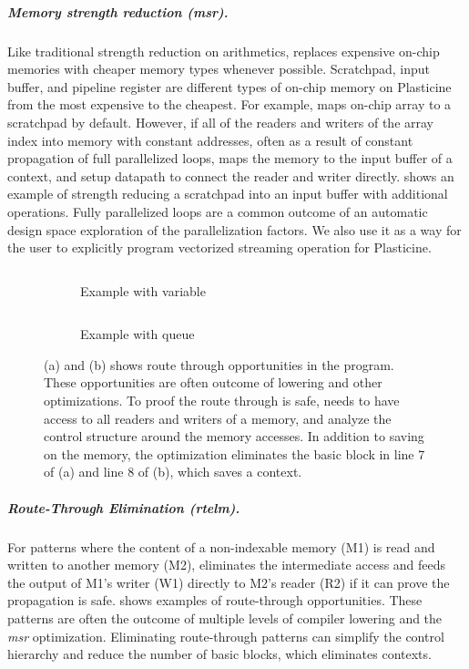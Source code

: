 \subparagraph{Memory strength reduction (msr).} Like traditional strength reduction on arithmetics,
\name{} replaces expensive on-chip memories with cheaper memory types whenever possible.
Scratchpad, input buffer, and pipeline register are different types of on-chip memory on Plasticine from
the most expensive to the cheapest.
For example, \name maps on-chip array to a scratchpad by default. However, if all of the readers and
writers of the array index into memory with constant addresses, often as a result of constant propagation of full
parallelized loops, \name maps the memory to the input buffer of a context, and setup datapath to
connect the reader and writer directly.
 shows an example of strength reducing a scratchpad into an input buffer with additional
operations.
Fully parallelized loops are a common outcome of an automatic design space exploration of the parallelization factors.
We also use it as a way for the user to explicitly program vectorized streaming operation for
Plasticine.

\begin{figure}
\centering
\begin{subfigure}[b]{0.45\textwidth}
\inputminted{python}{code/rteg1.py}
\caption{Example with variable}
\end{subfigure}
\hfill
\begin{subfigure}[b]{0.45\textwidth}
\inputminted{python}{code/rteg2.py}
\caption{Example with queue}
\end{subfigure}
\caption[Examples of route through elimination]{
  (a) and (b) shows route through opportunities in the program.
  These opportunities are often outcome of lowering and other optimizations. To proof the route
  through is safe, \name needs to have access to all readers and writers of a memory, and analyze
  the control structure around the memory accesses.
  In addition to saving on the memory, the optimization eliminates the basic block in line 7 of (a)
  and line 8 of (b), which saves a context.
}
\label{fig:rtelm}
\end{figure}

\subparagraph{Route-Through Elimination (rtelm).} 
For patterns where the content of a non-indexable memory (M1) is read and written to another memory
(M2), \name{} eliminates the intermediate access and feeds the output of M1's writer (W1) directly to M2's
reader (R2) if it can prove the propagation is safe.
 shows examples of route-through opportunities.
These patterns are often the
outcome of multiple levels of compiler lowering and the \emph{msr} optimization. 
Eliminating route-through patterns can simplify the control hierarchy and reduce the number of basic blocks, which eliminates contexts.

